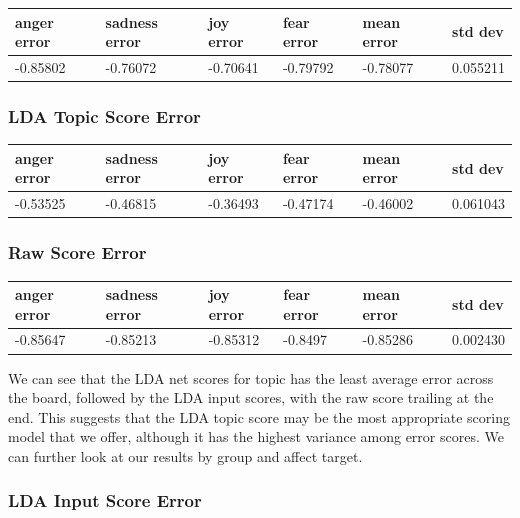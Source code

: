\documentclass[11pt, twoside, reqno]{book}
\begin{document}
\begin{tabular}{|l|l|l|l|l|l|}
\hline
    anger error & sadness error & joy error & fear error & mean error & std dev \\ \hline
    -0.85802 & -0.76072 & -0.70641 & -0.79792 & -0.78077 & 0.055211 \\ \hline
\end{tabular}
\vspace{16pt}

\subsubsection{\textbf{LDA Topic Score Error}}

\begin{tabular}{|l|l|l|l|l|l|}
\hline
    anger error & sadness error & joy error & fear error & mean error & std dev \\ \hline
    -0.53525 & -0.46815 & -0.36493 & -0.47174 & -0.46002 & 0.061043 \\ \hline
\end{tabular}
\vspace{16pt}

\subsubsection{\textbf{Raw Score Error}}
\begin{tabular}{|l|l|l|l|l|l|}
\hline
    anger error & sadness error & joy error & fear error & mean error & std dev \\ \hline
    -0.85647 & -0.85213 & -0.85312 & -0.8497 & -0.85286 & 0.002430 \\ \hline
\end{tabular}
\vspace{16pt}

We can see that the LDA net scores for topic has the least average error across the board, followed by the LDA input scores, with the raw score trailing at the end. This suggests that the LDA topic score may be the most appropriate scoring model that we offer, although it has the highest variance among error scores. We can further look at our results by group and affect target.

\subsubsection{\textbf{LDA Input Score Error}}
\end{document}
